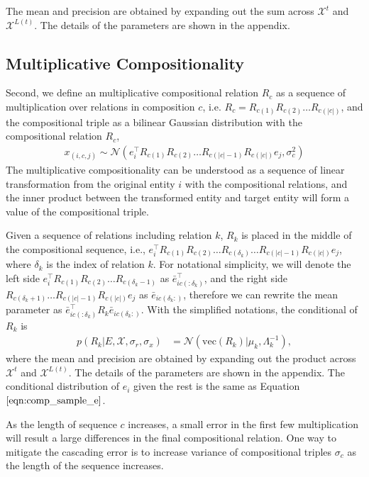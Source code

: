 The mean and precision are obtained by expanding out the sum across $\mathcal{X}^{t}$ and
$\mathcal{X}^{L(t)}$. The details of the parameters are shown in the appendix.


\subsection{Multiplicative Compositionality}
Second, we define an multiplicative compositional relation $R_c$ as a sequence of multiplication over
relations in composition $c$, i.e. $R_c = R_{c(1)} R_{c(2)} \dots R_{c(|c|)}$, and the compositional triple as a
bilinear Gaussian distribution with the compositional relation $R_c$,
\begin{align}
x_{(i, c, j)} \sim \mathcal{N}(e_i^\top R_{c(1)}R_{c(2)} \dots R_{c(|c|-1)}R_{c(|c|)} e_j, \sigma_{c}^2)
\end{align}
The multiplicative compositionality can be understood as a sequence of linear transformation from the original
entity $i$ with the compositional relations, and the inner product between the transformed entity and target
entity will form a value of the compositional triple.

Given a sequence of relations including relation $k$, $R_k$ is placed in the middle of the compositional
sequence, i.e., $e_i^\top R_{c(1)}R_{c(2)} \dots R_{c(\delta_k)} \dots R_{c(|c|-1)}R_{c(|c|)} e_j$, where $
\delta_k$ is the index of relation $k$. For notational simplicity, we will denote the left side $e_i^\top R_{c(1)}
R_{c(2)} \dots R_{c(\delta_k -1)}$ as $\bar{e}_{ic(:\delta_k)}^\top$, and the right side $R_{c(\delta_k + 1)} \dots
R_{c(|c|-1)}R_{c(|c|)} e_j$ as $\bar{e}_{ic(\delta_k:)}$, therefore we can rewrite the mean parameter as $
\bar{e}_{ic(:\delta_k)}^\top R_{k} \bar{e}_{ic(\delta_k:)}$. With the simplified notations, the conditional of $R_k$
is
\begin{align}
p(R_k|E, \mathcal{X}, \sigma_r, \sigma_x)  &= \mathcal{N}(\text{vec}(R_k) | \mu_k, \Lambda_k^{-1}),
\end{align}
where
the mean and precision are obtained by expanding out the product across $\mathcal{X}^{t}$ and
$\mathcal{X}^{L(t)}$. The details of the parameters are shown in the appendix.
The conditional distribution of $e_i$ given the rest is the same as Equation $\ref{eqn:comp_sample_e}$.

As the length of sequence $c$ increases, a small error in the first few multiplication will result a large
differences in the final compositional relation. One way to mitigate the cascading error is to increase variance
of compositional triples $\sigma_c$ as the length of the sequence increases.

